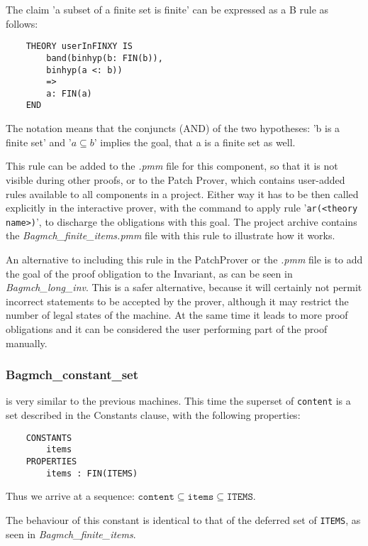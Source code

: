 \documentclass[11pt,journal]{IEEEtran}
\begin{document}
	The claim 'a subset of a finite set is finite' can be expressed as a B rule as follows:
		
	\begin{lstlisting}
	THEORY userInFINXY IS
		band(binhyp(b: FIN(b)), 
		binhyp(a <: b))
		=>
		a: FIN(a)
	END
	\end{lstlisting}
	
	The notation means that the conjuncts (AND) of the two hypotheses: 'b is a finite set' and '$a \subseteq b$' implies the goal, that a is a finite set as well.
	
	This rule can be added to the \emph{.pmm} file for this component, so that it is not visible during other proofs, or to the Patch Prover, which contains user-added rules available to all components in a project. Either way it has to be then called explicitly in the interactive prover, with the command to apply rule '\texttt{ar(<theory name>)}', to discharge the obligations with this goal. The project archive contains the \emph{Bagmch\_finite\_items.pmm} file with this rule to illustrate how it works. 
	
	An alternative to including this rule in the PatchProver or the \emph{.pmm} file is to add the goal of the proof obligation to the Invariant, as can be seen in \emph{Bagmch\_long\_inv}. This is a safer alternative, because it will certainly not permit incorrect statements to be accepted by the prover, although it may restrict the number of legal states of the machine. At the same time it leads to more proof obligations and it can be considered the user performing part of the proof manually.
	
	\subsubsection{Bagmch\_constant\_set} is very similar to the previous machines. This time the superset of \texttt{content} is a set described in the Constants clause, with the following properties:
	
	\begin{lstlisting}
	CONSTANTS
		items
	PROPERTIES
		items : FIN(ITEMS)
	\end{lstlisting}
	Thus we arrive at a sequence: $\texttt{content} \subseteq \texttt{items} \subseteq \texttt{ITEMS}$.
	
	The behaviour of this constant is identical to that of the deferred set of \texttt{ITEMS}, as seen in \emph{Bagmch\_finite\_items}.
	
\end{document}

